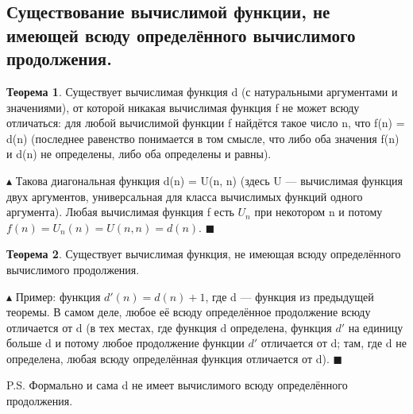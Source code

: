 \subsection{Существование вычислимой функции, не имеющей всюду определённого вычислимого продолжения.}

\textbf{Теорема 1}.  Существует вычислимая функция d (с натуральными аргументами и значениями), от которой никакая вычислимая функция f не может всюду отличаться: для любой вычислимой функции f найдётся такое число n, что f(n) = d(n) (последнее равенство понимается в том смысле, что либо оба значения f(n) и d(n) не определены, либо оба определены и равны).

$\blacktriangle$
Такова диагональная функция d(n) = U(n, n) (здесь U — вычислимая функция двух аргументов,
универсальная для класса вычислимых функций одного аргумента). Любая вычислимая функция f есть $U_n$ при некотором n и потому $f(n) = U_n(n) = U(n, n) = d(n)$.
$\blacksquare$

\textbf{Теорема 2}.  Существует вычислимая функция, не имеющая всюду определённого вычислимого продолжения.

$\blacktriangle$
Пример: функция $d'(n) = d(n) + 1$, где d — функция из предыдущей теоремы. В самом деле, любое её всюду определённое продолжение всюду отличается от d (в тех местах, где функция d
определена, функция $d'$ на единицу больше d и потому любое продолжение функции $d'$ отличается от d; там, где d не определена, любая всюду определённая функция отличается от d).
$\blacksquare$

P.S. Формально и сама d не имеет вычислимого всюду определённого продолжения.